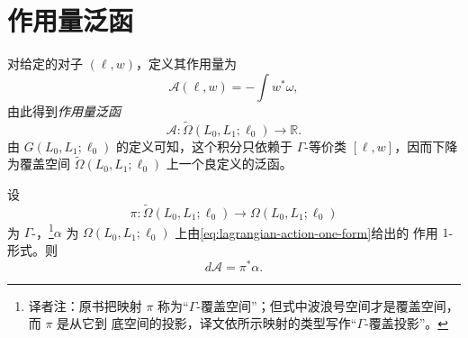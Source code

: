\section{作用量泛函}
\label{sec:action-functional}

对给定的对子 $(\ell,w)$，定义其作用量为
\[
  \mathcal A(\ell,w)=-\int w^*\omega,
\]
由此得到\emph{作用量泛函}
\[
  \mathcal A:
  \widetilde\Omega(L_0,L_1;\ell_0)\longrightarrow\mathbb R.
\]
由 $G(L_0,L_1;\ell_0)$ 的定义可知，这个积分只依赖于
$\Gamma$-等价类 $[\ell,w]$，因而下降为覆盖空间
$\widetilde\Omega(L_0,L_1;\ell_0)$ 上一个良定义的泛函。

\begin{proposition}
\label{prop:action-functional-primitive}
设
\[
  \pi:\widetilde\Omega(L_0,L_1;\ell_0)
  \longrightarrow\Omega(L_0,L_1;\ell_0)
\]
为 $\Gamma$-\termCoveringProjection{}，\footnote{译者注：原书把映射 $\pi$
称为“$\Gamma$-覆盖空间”；但式中波浪号空间才是覆盖空间，而 $\pi$ 是从它到
底空间的投影，译文依所示映射的类型写作“$\Gamma$-覆盖投影”。}$\alpha$ 为
$\Omega(L_0,L_1;\ell_0)$ 上由\eqref{eq:lagrangian-action-one-form}给出的
作用 $1$-形式。则
\begin{equation}
  d\mathcal A=\pi^*\alpha.
\label{eq:action-form-pullback}
\end{equation}
\end{proposition}

